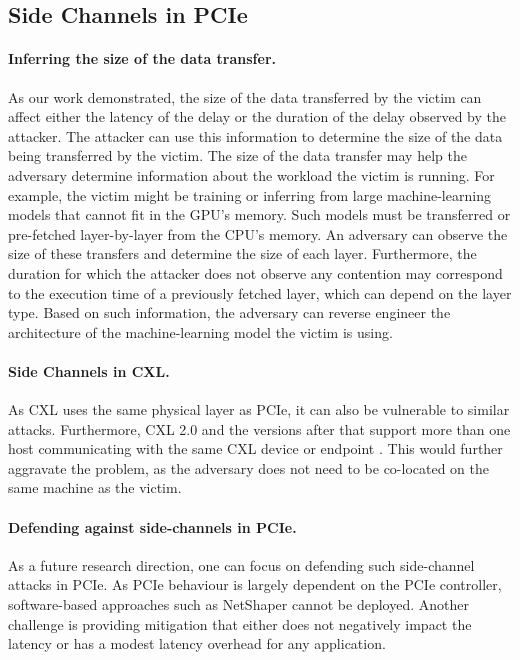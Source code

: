 \subsection{Side Channels in PCIe}
\label{subsec:future-work-side-channels}

\paragraph{Inferring the size of the data transfer.}
As our work demonstrated, the size of the data transferred by the victim can affect either the latency of the delay or the duration of the delay observed by the attacker.
The attacker can use this information to determine the size of the data being transferred by the victim.
The size of the data transfer may help the adversary determine information about the workload the victim is running.
For example, the victim might be training or inferring from large machine-learning models that cannot fit in the GPU's memory.
Such models must be transferred or pre-fetched layer-by-layer from the CPU's memory.
An adversary can observe the size of these transfers and determine the size of each layer.
Furthermore, the duration for which the attacker does not observe any contention may correspond to the execution time of a previously fetched layer, which can depend on the layer type.
Based on such information, the adversary can reverse engineer the architecture of the machine-learning model the victim is using.

\paragraph{Side Channels in CXL.}
As CXL uses the same physical layer as PCIe, it can also be vulnerable to similar attacks.
Furthermore, CXL 2.0 and the versions after that support more than one host communicating with the same CXL device or endpoint \cite{cxl_2}.
This would further aggravate the problem, as the adversary does not need to be co-located on the same machine as the victim.

\paragraph{Defending against side-channels in PCIe.}
As a future research direction, one can focus on defending such side-channel attacks in PCIe.
As PCIe behaviour is largely dependent on the PCIe controller, software-based approaches such as NetShaper cannot be deployed.
Another challenge is providing mitigation that either does not negatively impact the latency or has a modest latency overhead for any application.
